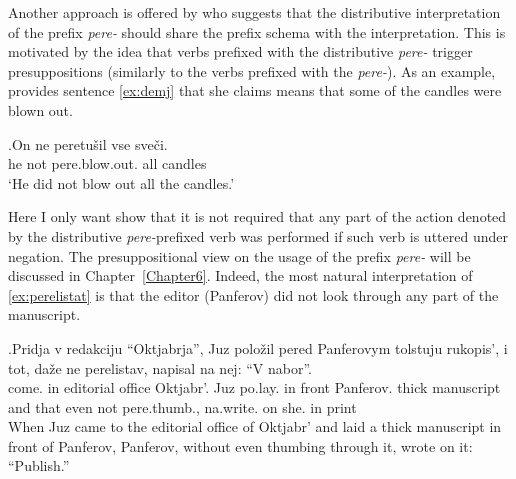 Another approach is offered by \citet{Demjjanow:97} who suggests that the distributive interpretation of the prefix \textit{pere-} should share the prefix schema with the  interpretation. This is motivated by the idea that verbs prefixed with the distributive \textit{pere-} trigger presuppositions (similarly to the verbs prefixed with the  \textit{pere-}). As an example, \citet{Demjjanow:97} provides sentence \ref{ex:demj} that she claims means that some of the candles were blown out.

\exg.\label{ex:demj}On ne peretu\v{s}il vse sve\v{c}i.\\
he not pere.blow.out. all candles\\
\trans `He did not blow out all the candles.'\\

Here I only want show that it is not required that any part of the action denoted by the distributive \textit{pere-}prefixed verb was performed if such verb is uttered under negation. The presuppositional view on the  usage of the prefix \textit{pere-} will be discussed in Chapter~\ref{Chapter6}. Indeed, the most natural interpretation of \ref{ex:perelistat} is that the editor (Panferov) did not look through any part of the manuscript.

\exg.\label{ex:perelistat}Pridja v redakciju ``Oktjabrja'', Juz polo\v{z}il pered Panferovym tolstuju rukopis', i tot, da\v{z}e ne perelistav, napisal na nej: ``V nabor''.\\
come. in {editorial office} Oktjabr'. Juz po.lay. {in front} Panferov. thick manuscript and that even not pere.thumb., na.write. on she. in 	print\\
\vspace{0.5em}
When Juz came to the editorial office of Oktjabr' and laid a thick manuscript in front of Panferov, Panferov, without even thumbing through it, wrote on it: ``Publish.''




